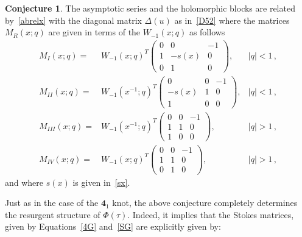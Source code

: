 \documentclass[12pt,reqno]{amsart}
\theoremstyle{definition}
\newtheorem{conjecture}[theorem]{Conjecture}
\def\-{\,-\,}
\def\md{\mathbf}
\newcommand{\knot}[1]{\md{#1}}
\begin{document}
\begin{conjecture}
  \label{conj.52M}
  The asymptotic series and the holomorphic blocks are related
  by~\eqref{abrelx} with the diagonal matrix $\Delta(u)$ as
  in~\eqref{D52} where the matrices $M_R(x;q)$ are given in terms of
  the $W_{-1}(x;q)$ as follows 
\begin{subequations}
\begin{align}
  M_{I}(x;q) =
  &W_{-1}(x;q)^T
    \begin{pmatrix}
      0&0&-1\\1&-s(x)&0\\0&1&0
    \end{pmatrix}, & |q|<1\,,
  \label{eq:M1-52}\\
  M_{II}(x;q) =
  &W_{-1}(x^{-1};q)^T
    \begin{pmatrix}
      0&0&-1\\-s(x)&1&0\\1&0&0
    \end{pmatrix}, & |q|<1\,,
  \label{eq:M2-52}\\
  M_{III}(x;q) =
  &W_{-1}(x^{-1};q)^T
    \begin{pmatrix}
      0&0&-1\\1&1&0\\1&0&0
    \end{pmatrix}, & |q|>1\,,
  \label{eq:M3-52}\\
  M_{IV}(x;q) =
  &W_{-1}(x;q)^T
    \begin{pmatrix}
      0&0&-1\\1&1&0\\0&1&0
    \end{pmatrix}, & |q|>1\,,
                             \label{eq:M4-52}
\end{align}
\end{subequations}
and where $s(x)$ is given in~\eqref{sx}. 
\end{conjecture}
Just as in the case of the $\knot{4}_1$ knot, 
the above conjecture completely determines the resurgent structure of
$\Phi(\tau)$. Indeed, it implies that the Stokes matrices, given by
Equations~\eqref{4G} and~\eqref{SG} are explicitly
given by:
\end{document}
